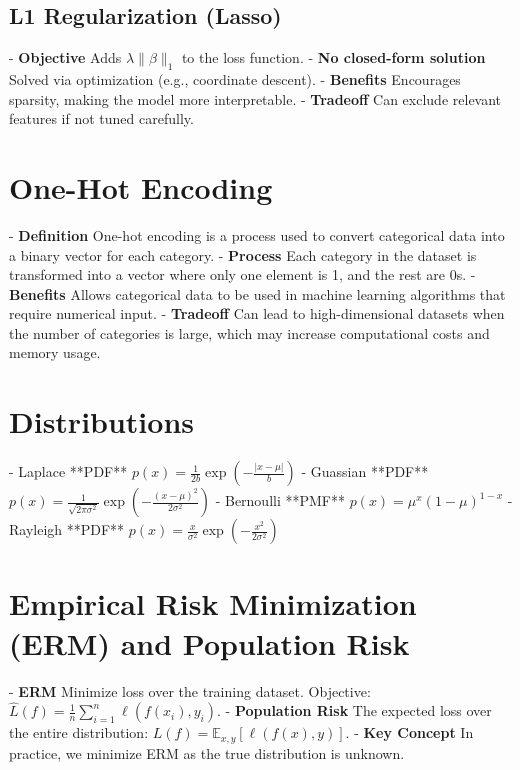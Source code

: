 \documentclass[10pt]{article}
\begin{document}
\begin{multicols}{2}
\subsection*{L1 Regularization (Lasso)}
- \textbf{Objective} Adds $\lambda \|\beta\|_1$ to the loss function.
- \textbf{No closed-form solution} Solved via optimization (e.g., coordinate descent).
- \textbf{Benefits} Encourages sparsity, making the model more interpretable.
- \textbf{Tradeoff} Can exclude relevant features if not tuned carefully.

\section*{One-Hot Encoding}
- \textbf{Definition} One-hot encoding is a process used to convert categorical data into a binary vector for each category.
- \textbf{Process} Each category in the dataset is transformed into a vector where only one element is 1, and the rest are 0s.
- \textbf{Benefits} Allows categorical data to be used in machine learning algorithms that require numerical input.
- \textbf{Tradeoff} Can lead to high-dimensional datasets when the number of categories is large, which may increase computational costs and memory usage.

\section*{Distributions}

- Laplace **PDF** $p(x) = \frac{1}{2b} \exp\left(-\frac{|x-\mu|}{b}\right)$
- Guassian **PDF** $p(x) = \frac{1}{\sqrt{2\pi\sigma^2}} \exp\left(-\frac{(x-\mu)^2}{2\sigma^2}\right)$
- Bernoulli **PMF** $p(x) = \mu^x(1-\mu)^{1-x}$
- Rayleigh **PDF** $p(x) = \frac{x}{\sigma^2} \exp\left(-\frac{x^2}{2\sigma^2}\right)$




\section*{Empirical Risk Minimization (ERM) and Population Risk}
- \textbf{ERM} Minimize loss over the training dataset. Objective: $\hat{L}(f) = \frac{1}{n} \sum_{i=1}^{n} \ell(f(x_i), y_i)$.
- \textbf{Population Risk} The expected loss over the entire distribution: $L(f) = \mathbb{E}_{x,y}[\ell(f(x), y)]$.
- \textbf{Key Concept} In practice, we minimize ERM as the true distribution is unknown.


\end{multicols}
\end{document}
